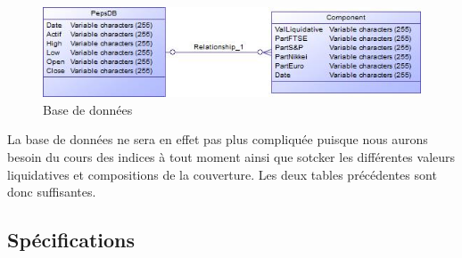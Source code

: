 \documentclass[french,12pt,a4paper]{article}
\begin{document}
\begin{figure}[h!]
  \caption{Base de données}
  \centering
    \includegraphics[scale=1]{BD.jpg}
\end{figure}

La base de données ne sera en effet pas plus compliquée puisque nous aurons besoin du cours des indices à tout moment ainsi que sotcker les différentes valeurs liquidatives et compositions de la couverture. Les deux tables précédentes sont donc suffisantes.



\subsection{Spécifications}
\end{document}
